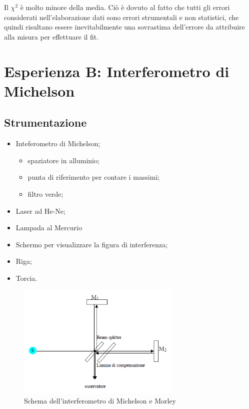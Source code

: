 \documentclass[a4paper,10pt]{article}
\begin{document}
{{{{%

Il $\chi^2$ è molto minore della media. Ciò è dovuto al fatto che tutti gli errori considerati nell'elaborazione dati sono errori strumentali e non statistici, che quindi risultano essere inevitabilmente una sovrastima dell'errore da attribuire alla misura per effettuare il fit.

 

\section{Esperienza B: Interferometro di Michelson}

\subsection{Strumentazione}

\begin{itemize}
	\item Inteferometro di Michelson;
	\begin{itemize}
		\item spaziatore in alluminio;
		\item punta di riferimento per contare i massimi;
		\item filtro verde;		
	\end{itemize}
	\item Laser ad He-Ne;
	\item Lampada al Mercurio
	\item Schermo per visualizzare la figura di interferenza;
	\item Riga;
	\item Torcia.
\end{itemize}

\begin{figure}[H]
	\centering
	\includegraphics[width=0.7\textwidth]{../grafici/MichelsonMorley.png}
	\caption{Schema dell'interferometro di Michelson e Morley}
	\label{fig:MMint}
\end{figure}

}}}}
\end{document}
